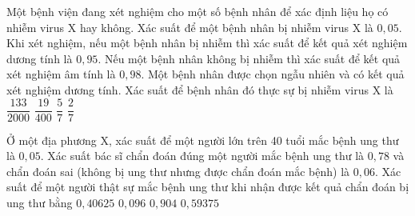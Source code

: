 \begin{ex}%
    Một bệnh viện đang xét nghiệm cho một số bệnh nhân để xác định liệu họ có nhiễm virus X hay không. Xác suất để một bệnh nhân bị nhiễm virus X là $0,05$. Khi xét nghiệm, nếu một bệnh nhân bị nhiễm thì xác suất để kết quả xét nghiệm dương tính là $0,95$. Nếu một bệnh nhân không bị nhiễm thì xác suất để kết quả xét nghiệm âm tính là $0,98$. Một bệnh nhân được chọn ngẫu nhiên và có kết quả xét nghiệm dương tính. Xác suất để bệnh nhân đó thực sự bị nhiễm virus X là
    \choice
    {$\dfrac{133}{2000}$}
    {$\dfrac{19}{400}$}
    {\True $\dfrac{5}{7}$}
    {$\dfrac{2}{7}$}
\end{ex}
\begin{ex}%
    Ở một địa phương X, xác suất để một người lớn trên 40 tuổi mắc bệnh ung thư là $0,05$. Xác suất bác sĩ chẩn đoán đúng một người mắc bệnh ung thư là $0,78$ và chẩn đoán sai (không bị ung thư nhưng được chẩn đoán mắc bệnh) là $0,06$. Xác suất để một người thật sự mắc bệnh ung thư khi nhận được kết quả chẩn đoán bị ung thư bằng
    \choice
    {\True $0,40625$}
    {$0,096$}
    {$0,904$}
    {$0,59375$}
\end{ex}
